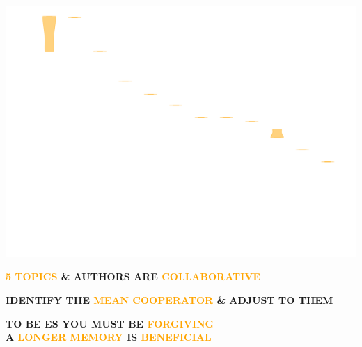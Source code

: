 \documentclass{beamer}
\begin{document}
\begin{frame}
    \begin{center}
    
    \end{center}
\end{frame}
\begin{frame}
    \begin{center}
        \includegraphics[width=\textwidth]{static/lstm_performance.png}
    \end{center}
\end{frame}
\begin{frame}
    \begin{center}
    \Large{\textbf{\textcolor{orange}{5 TOPICS} \& AUTHORS ARE  \textcolor{orange}{COLLABORATIVE}}}
    \end{center}
\end{frame}

\begin{frame}
    \begin{center}
    \Large{\textbf{IDENTIFY THE \textcolor{orange}{MEAN COOPERATOR} \& ADJUST TO THEM}} \\ 
    \end{center}
\end{frame}

\begin{frame}
    \begin{center}
    \Large{\textbf{TO BE ES YOU MUST BE \textcolor{orange}{FORGIVING}}} \\ \vspace{1cm}
    \Large{\textbf{A \textcolor{orange}{LONGER MEMORY} IS \textcolor{orange}{BENEFICIAL}}} \\
    \end{center}
\end{frame}
\end{document}
